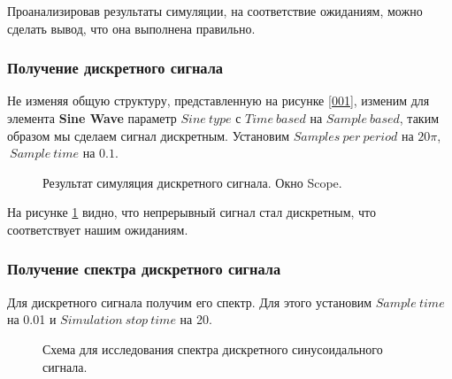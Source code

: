 \documentclass[a4paper,14pt]{extarticle}
\begin{document}
Проанализировав результаты симуляции, на соответствие ожиданиям, можно сделать вывод, что она выполнена правильно.

\subsubsection{Получение дискретного сигнала}

Не изменяя общую структуру, представленную на рисунке \ref{001}, изменим для элемента \textbf{Sine Wave} параметр $Sine \ type$ с $Time \ based$ на $Sample \ based$, таким образом мы сделаем сигнал дискретным. Установим $Samples \ per \ period$ на $20\pi$, $\ Sample \ time$ на $0.1$.

\begin{figure}[H]
\caption{Результат симуляция дискретного сигнала. Окно Scope.}
\label{003}
\end{figure}

На рисунке \ref{003} видно, что непрерывный сигнал стал дискретным, что соответствует нашим ожиданиям.

\subsubsection{Получение спектра дискретного сигнала}

Для дискретного сигнала получим его спектр. Для этого установим $Sample \ time$ на 0.01 и $Simulation \ stop \ time$ на 20.

\begin{figure}[H]
\caption{Схема для исследования спектра дискретного синусоидального сигнала.}
\label{004}
\end{figure}
\end{document}
